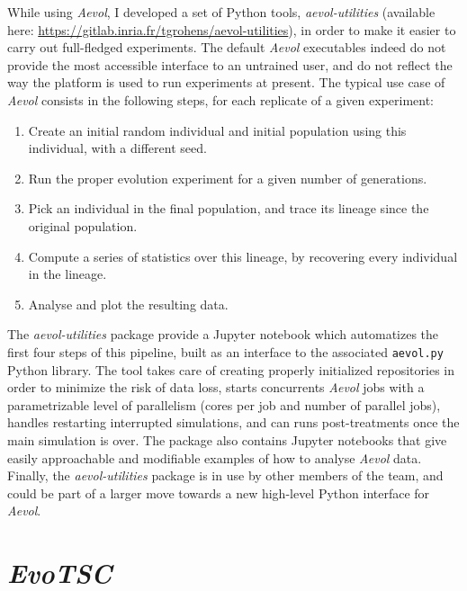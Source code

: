 While using \emph{Aevol}, I developed a set of Python tools, \emph{aevol-utilities} (available here: \url{https://gitlab.inria.fr/tgrohens/aevol-utilities}), in order to make it easier to carry out full-fledged experiments.
The default \emph{Aevol} executables indeed do not provide the most accessible interface to an untrained user, and do not reflect the way the platform is used to run experiments at present.
The typical use case of \emph{Aevol} consists in the following steps, for each replicate of a given experiment:
\begin{enumerate}
  \item Create an initial random individual and initial population using this individual, with a different seed.
  \item Run the proper evolution experiment for a given number of generations.
  \item Pick an individual in the final population, and trace its lineage since the original population.
  \item Compute a series of statistics over this lineage, by recovering every individual in the lineage.
  \item Analyse and plot the resulting data.
\end{enumerate}

The \emph{aevol-utilities} package provide a Jupyter notebook which automatizes the first four steps of this pipeline, built as an interface to the associated \texttt{aevol.py} Python library.
The tool takes care of creating properly initialized repositories in order to minimize the risk of data loss, starts concurrents \emph{Aevol} jobs with a parametrizable level of parallelism (cores per job and number of parallel jobs), handles restarting interrupted simulations, and can runs post-treatments once the main simulation is over.
The package also contains Jupyter notebooks that give easily approachable and modifiable examples of how to analyse \emph{Aevol} data.
Finally, the \emph{aevol-utilities} package is in use by other members of the team, and could be part of a larger move towards a new high-level Python interface for \emph{Aevol}.



\section{\emph{EvoTSC}}

